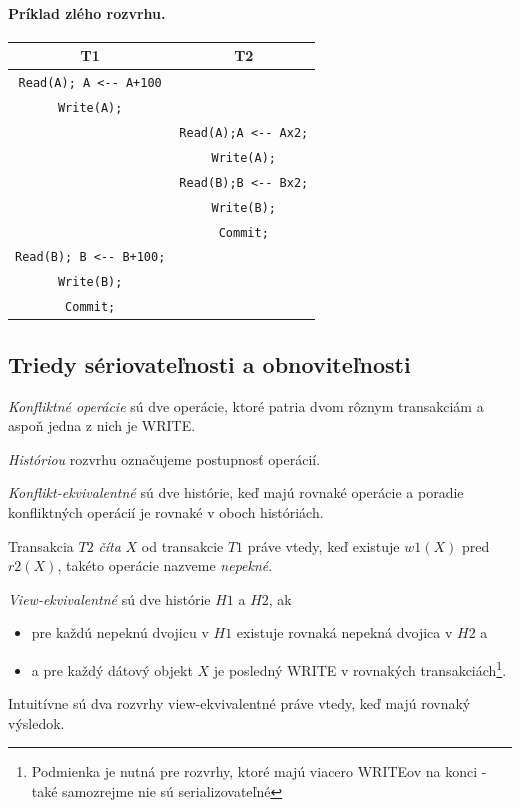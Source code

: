 \documentclass[10pt,a4paper]{article}
\begin{document}
\paragraph{Príklad zlého rozvrhu.}
\begin{center}
\begin{tabular}{c|c}
T1 & T2 \\
\hline
\verb|Read(A); A <-- A+100| & \\
\verb|Write(A);| & \\
& \verb|Read(A);A <-- Ax2;| \\
& \verb|Write(A);| \\
& \verb|Read(B);B <-- Bx2;| \\
& \verb|Write(B);| \\
& \verb|Commit;| \\
\verb|Read(B); B <-- B+100;| & \\
\verb|Write(B);| & \\
\verb|Commit;| & \\
\end{tabular}
\end{center}

\subsection{Triedy sériovateľnosti a obnoviteľnosti}

\emph{Konfliktné operácie} sú dve operácie, ktoré patria dvom rôznym transakciám a aspoň jedna z nich je WRITE. 

\emph{Históriou} rozvrhu označujeme postupnosť operácií. 

\emph{Konflikt-ekvivalentné} sú dve histórie, keď majú rovnaké operácie a poradie konfliktných operácií je rovnaké v oboch históriách. 

Transakcia $T2$ \emph{číta} $X$ od transakcie $T1$ práve vtedy, keď existuje $w1(X)$ pred $r2(X)$,
takéto operácie nazveme \emph{nepekné}. 

\emph{View-ekvivalentné} sú dve histórie $H1$ a $H2$, ak 
\begin{itemize}
\item pre každú nepeknú dvojicu v $H1$ existuje rovnaká nepekná dvojica v $H2$ a
\item a pre každý dátový objekt $X$ je posledný WRITE v rovnakých transakciách\footnote{Podmienka je nutná pre rozvrhy, ktoré majú viacero WRITEov na konci - také samozrejme nie sú serializovateľné}. 
\end{itemize}
Intuitívne sú dva rozvrhy view-ekvivalentné práve vtedy, keď majú rovnaký výsledok. 
\end{document}
